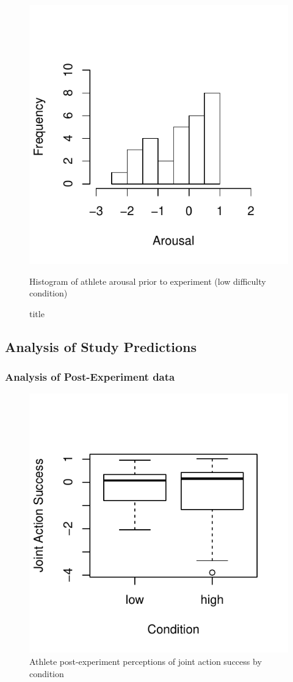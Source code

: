 \begin{figure}
  \centering
  \includegraphics[width=0.5\linewidth,keepaspectratio] {images/histArousalFactorPreLow-1}
      \caption{Histogram of athlete arousal prior to experiment (low difficulty condition)}
  \caption{title}
    \label{fig:histArousalFactorPreLow}
\end{figure}

















\subsection{Analysis of Study Predictions\label{app6:analysisStudyPredictions}}





\subsubsection{Analysis of Post-Experiment data\label{app6:postExperimentData}}






\begin{figure}
    \centering
    \includegraphics[width=0.5\linewidth,keepaspectratio] {images/groupJointActionSuccessPostBoxPlot-1}
    \caption{Athlete post-experiment perceptions of joint action success by condition}
              \label{fig:groupJointActionSuccessPostBoxPlot}
\end{figure}

